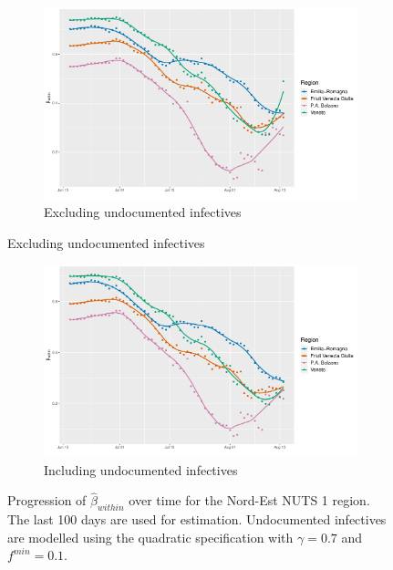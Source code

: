 \documentclass[12pt]{article}
\begin{document}
	\begin{figure}[H]
	    \centering
	    \begin{subfigure}{\textwidth}
	      \centering
	      \includegraphics[width=0.94\linewidth]{output/model_within_lag14_betawithin_Nord-Est_rolling.pdf}
	      \caption{Excluding undocumented infectives}
	      \label{fig:beta_within_over_time_nordest_regular}
	    \end{subfigure}
    \end{figure}
    \begin{figure}[H]\ContinuedFloat
	    \begin{subfigure}{\textwidth}
	      \centering
	      \includegraphics[width=0.94\linewidth]{output/model_within_lag14_betawithin_Nord-Est_UndocQuadratic_rolling.pdf}
	      \caption{Including undocumented infectives}
	      \label{fig:beta_within_over_time_nordest_regular_undoc}
	    \end{subfigure}
	    \caption{Progression of $\widehat{\beta}_{within}$ over time for the Nord-Est NUTS 1 region. The last 100 days are used for estimation. Undocumented infectives are modelled using the quadratic specification with $\gamma = 0.7$ and $f^{min}=0.1$.}
	    \label{fig:beta_within_over_time_nordest}
    \end{figure}
	
\end{document}
